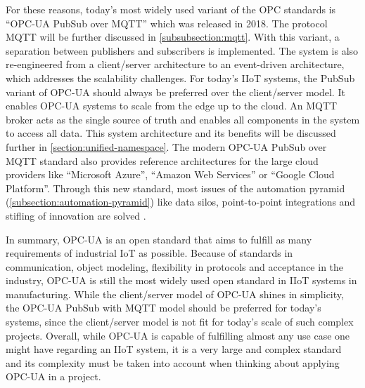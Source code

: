    For these reasons, today's most widely used variant of the OPC standards is ``OPC-UA PubSub over MQTT'' which was released in 2018. The protocol MQTT will be further discussed in \autoref{subsubsection:mqtt}. With this variant, a separation between publishers and subscribers is implemented. The system is also re-engineered from a client/server architecture to an event-driven architecture, which addresses the scalability challenges. For today's IIoT systems, the PubSub variant of OPC-UA should always be preferred over the client/server model. It enables OPC-UA systems to scale from the edge up to the cloud. An MQTT broker acts as the single source of truth and enables all components in the system to access all data. This system architecture and its benefits will be discussed further in \autoref{section:unified-namespace}. The modern OPC-UA PubSub over MQTT standard also provides reference architectures for the large cloud providers like ``Microsoft Azure'', ``Amazon Web Services'' or ``Google Cloud Platform''. Through this new standard, most issues of the automation pyramid (\autoref{subsection:automation-pyramid}) like data silos, point-to-point integrations and stifling of innovation are solved \cite{manditereza_key_nodate}.\newline

    In summary, OPC-UA is an open standard that aims to fulfill as many requirements of industrial IoT as possible. Because of standards in communication, object modeling, flexibility in protocols and acceptance in the industry, OPC-UA is still the most widely used open standard in IIoT systems in manufacturing. While the client/server model of OPC-UA shines in simplicity, the OPC-UA PubSub with MQTT model should be preferred for today's systems, since the client/server model is not fit for today's scale of such complex projects. Overall, while OPC-UA is capable of fulfilling almost any use case one might have regarding an IIoT system, it is a very large and complex standard and its complexity must be taken into account when thinking about applying OPC-UA in a project.  